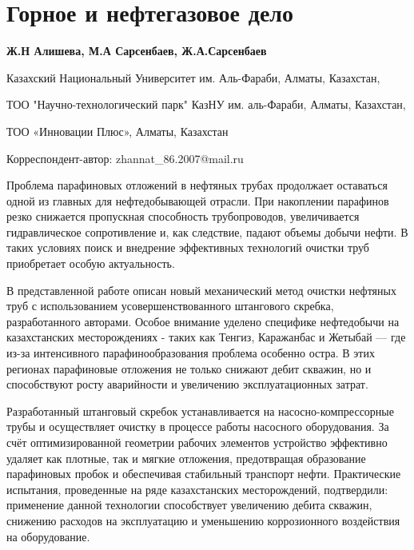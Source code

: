 \newpage
\let\cleardoublepage\clearpage
\chapter{Горное и нефтегазовое дело}

\begin{header}

{\bfseries
{}Ж.Н Алишева\envelope,
М.А Сарсенбаев,
Ж.А.Сарсенбаев
}
\end{header}

\begin{affil}
Казахский Национальный Университет им. Аль-Фараби, Алматы, Казахстан,

ТОО "Научно-технологический парк" КазНУ им. аль-Фараби, Алматы, Казахстан,

ТОО «Инновации Плюс», Алматы, Казахстан

\envelope Корреспондент-автор: zhannat\_86.2007@mail.ru
\end{affil}

Проблема парафиновых отложений в нефтяных трубах продолжает оставаться
одной из главных для нефтедобывающей отрасли. При накоплении парафинов
резко снижается пропускная способность трубопроводов, увеличивается
гидравлическое сопротивление и, как следствие, падают объемы добычи
нефти. В таких условиях поиск и внедрение эффективных технологий очистки
труб приобретает особую актуальность.

В представленной работе описан новый механический метод очистки нефтяных
труб с использованием усовершенствованного штангового скребка,
разработанного авторами. Особое внимание уделено специфике нефтедобычи
на казахстанских месторождениях - таких как Тенгиз, Каражанбас и Жетыбай
--- где из-за интенсивного парафинообразования проблема особенно остра.
В этих регионах парафиновые отложения не только снижают дебит скважин,
но и способствуют росту аварийности и увеличению эксплуатационных
затрат.

Разработанный штанговый скребок устанавливается на насосно-компрессорные
трубы и осуществляет очистку в процессе работы насосного оборудования.
За счёт оптимизированной геометрии рабочих элементов устройство
эффективно удаляет как плотные, так и мягкие отложения, предотвращая
образование парафиновых пробок и обеспечивая стабильный транспорт нефти.
Практические испытания, проведенные на ряде казахстанских месторождений,
подтвердили: применение данной технологии способствует увеличению дебита
скважин, снижению расходов на эксплуатацию и уменьшению коррозионного
воздействия на оборудование.

